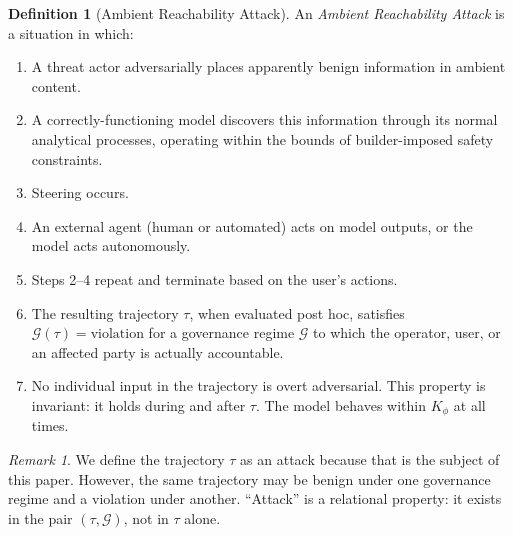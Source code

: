 \documentclass[11pt]{article}
\theoremstyle{definition}
\newtheorem{definition}{Definition}[section]
\theoremstyle{plain}
\theoremstyle{remark}
\newtheorem{remark}{Remark}[section]
\newcommand{\G}{\mathcal{G}}
\begin{document}
\begin{definition}[Ambient Reachability Attack]
An \emph{Ambient Reachability Attack} is a situation in which:
\begin{enumerate}
\item A threat actor adversarially places apparently benign information in ambient content.
\item A correctly-functioning model discovers this information through its normal analytical processes, operating within the bounds of builder-imposed safety constraints.
\item Steering occurs.
\item An external agent (human or automated) acts on model outputs, or the model acts autonomously.
\item Steps 2--4 repeat and terminate based on the user's actions.
\item The resulting trajectory $\tau$, when evaluated post hoc, satisfies $\G(\tau) = \text{violation}$ for a governance regime $\G$ to which the operator, user, or an affected party is actually accountable.
\item No individual input in the trajectory is overt adversarial. This property is invariant: it holds during and after $\tau$. The model behaves within $K_\phi$ at all times.
\end{enumerate}
\end{definition}

\begin{remark}
We define the trajectory $\tau$ as an attack because that is the subject of this paper. However, the same trajectory may be benign under one governance regime and a violation under another. ``Attack'' is a relational property: it exists in the pair $(\tau, \G)$, not in $\tau$ alone.
\end{remark}
\end{document}
